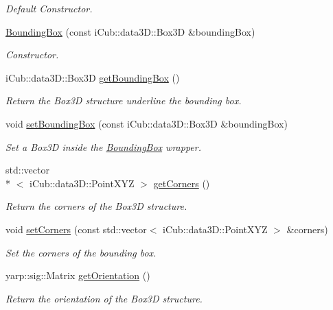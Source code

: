 \begin{DoxyCompactItemize}
\begin{DoxyCompactList}\small\item\em Default Constructor. \end{DoxyCompactList}\item 
\hyperlink{classiCub_1_1data3D_1_1BoundingBox_a5c2f97ac3178b7b04610428d4cf14a3d}{Bounding\+Box} (const i\+Cub\+::data3\+D\+::\+Box3\+D \&bounding\+Box)
\begin{DoxyCompactList}\small\item\em Constructor. \end{DoxyCompactList}\item 
i\+Cub\+::data3\+D\+::\+Box3\+D \hyperlink{classiCub_1_1data3D_1_1BoundingBox_a4930ffe6b57fc6823adb80b2f4143619}{get\+Bounding\+Box} ()
\begin{DoxyCompactList}\small\item\em Return the Box3\+D structure underline the bounding box. \end{DoxyCompactList}\item 
void \hyperlink{classiCub_1_1data3D_1_1BoundingBox_ab9c2a8dfb61a2c0c02529968df5a2e2e}{set\+Bounding\+Box} (const i\+Cub\+::data3\+D\+::\+Box3\+D \&bounding\+Box)
\begin{DoxyCompactList}\small\item\em Set a Box3\+D inside the \hyperlink{classiCub_1_1data3D_1_1BoundingBox}{Bounding\+Box} wrapper. \end{DoxyCompactList}\item 
std\+::vector\\*
$<$ i\+Cub\+::data3\+D\+::\+Point\+X\+Y\+Z $>$ \hyperlink{classiCub_1_1data3D_1_1BoundingBox_a08949c30ec7ee296981c11ad5ff4714e}{get\+Corners} ()
\begin{DoxyCompactList}\small\item\em Return the corners of the Box3\+D structure. \end{DoxyCompactList}\item 
void \hyperlink{classiCub_1_1data3D_1_1BoundingBox_a0cf2386f7eb05f18a69ccca09c589c17}{set\+Corners} (const std\+::vector$<$ i\+Cub\+::data3\+D\+::\+Point\+X\+Y\+Z $>$ \&corners)
\begin{DoxyCompactList}\small\item\em Set the corners of the bounding box. \end{DoxyCompactList}\item 
yarp\+::sig\+::\+Matrix \hyperlink{classiCub_1_1data3D_1_1BoundingBox_a2f5c9ef6a7d295e0ae60d1bf51c236b6}{get\+Orientation} ()
\begin{DoxyCompactList}\small\item\em Return the orientation of the Box3\+D structure. \end{DoxyCompactList}\item 

\end{DoxyCompactItemize}
